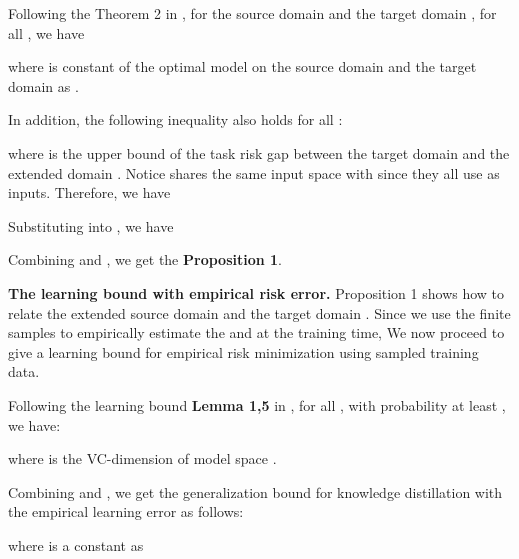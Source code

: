 \documentclass{article}
\begin{document}
Following the Theorem 2 in \citet{DBLP:journals/ml/Ben-DavidBCKPV10}, for the source domain  and the target domain , for all , we have

where  is constant of the optimal model on the source domain and the target domain as . 

In addition, the following inequality also holds for all :

where  is the upper bound of the task risk gap between the target domain  and the extended domain . Notice  shares the same input space with  since they all use  as inputs. Therefore, we have

Substituting  into , we have 

Combining  and , we get the \textbf{Proposition 1}.

\textbf{The learning bound with empirical risk error.} Proposition 1 shows how to relate the extended source domain  and the target domain . Since we use the finite samples to empirically estimate the  and  at the training time, We now proceed to give a learning
bound for empirical risk minimization using  sampled training data.

Following the learning bound \textbf{Lemma 1,5} in \citet{DBLP:journals/ml/Ben-DavidBCKPV10}, for all , with probability at least , we have:

where  is the VC-dimension of model space . 

Combining  and , we get the generalization bound for knowledge distillation with the empirical learning error as follows:

where  is a constant as 
\end{document}
